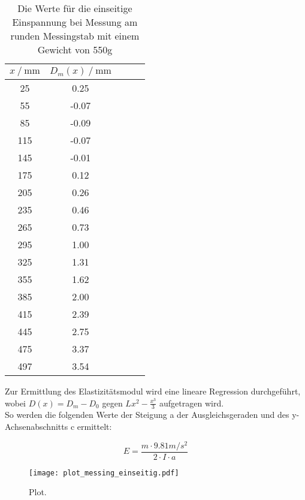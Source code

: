 \begin{table}[H]
  \centering
  \caption{Die Werte für die einseitige Einspannung bei Messung am runden Messingstab mit einem Gewicht von 550g}
  \begin{tabular}{ccccc}
    \toprule
    {$x \mathbin{/} \unit{\milli\metre}$} &
    {$D_m(x) \mathbin{/} \unit{\milli\metre}$} \\
    \midrule
    25 & 0.25 \\
    55 & -0.07 \\
    85 & -0.09 \\
    115 & -0.07 \\
    145 & -0.01 \\
    175 & 0.12 \\
    205 & 0.26 \\ 
    235 & 0.46 \\
    265 & 0.73 \\
    295 & 1.00\\
    325 & 1.31 \\
    355 & 1.62 \\
    385 & 2.00 \\
    415 & 2.39 \\
    445 & 2.75 \\
    475 & 3.37 \\
    497 & 3.54 \\
    
    \bottomrule
  \end{tabular}
  \label{tab:Tabelle3}
\end{table}

Zur Ermittlung des Elastizitätsmodul wird eine lineare Regression durchgeführt, wobei $D(x) = D_m - D_0$ gegen 
$Lx^2 - \frac{x^3}{3}$ aufgetragen wird.\\
So werden die folgenden Werte der Steigung a der Ausgleichsgeraden und des y-Achsenabschnitts c ermittelt:


\begin{equation}
  E = \frac{m \cdot 9.81 m/s^2}{2 \cdot I \cdot a} %
\end{equation}
 


\begin{figure}
  \centering
  \texttt{[image: plot\_messing\_einseitig.pdf]}
  \caption{Plot.}
  \label{fig:plot}
\end{figure}

